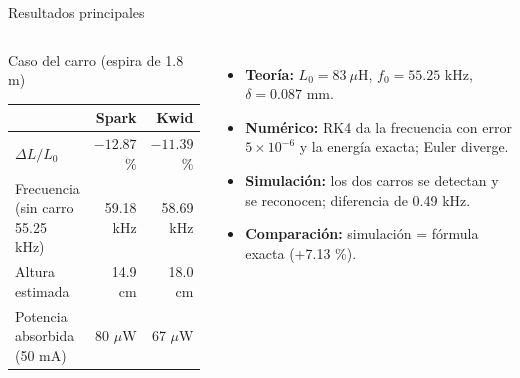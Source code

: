 \documentclass[aspectratio=169,10pt]{beamer}
\begin{document}
\begin{frame}{Resultados principales}

\begin{columns}[T]


\begin{block}{Caso del carro (espira de 1.8 m)}
\footnotesize
\begin{tabular}{@{}lrr@{}}
\toprule
 & Spark & Kwid \\
\midrule
$\Delta L/L_0$ & $-12.87$ \% & $-11.39$ \% \\
Frecuencia (sin carro 55.25 kHz) & 59.18 kHz & 58.69 kHz \\
Altura estimada & 14.9 cm & 18.0 cm \\
Potencia absorbida (50 mA) & 80 $\mu$W & 67 $\mu$W \\
\bottomrule
\end{tabular}
\end{block}


\begin{itemize}
 \item \textbf{Teoría:} $L_0 = 83~\mu$H, $f_0 = 55.25$ kHz, $\delta = 0.087$ mm.
 \item \textbf{Numérico:} RK4 da la frecuencia con error $5\times10^{-6}$ y la energía exacta; Euler diverge.
 \item \textbf{Simulación:} los dos carros se detectan y se reconocen; diferencia de 0.49 kHz.
 \item \textbf{Comparación:} simulación = fórmula exacta (+7.13 \%).
\end{itemize}

\end{columns}

\end{frame}
\end{document}

